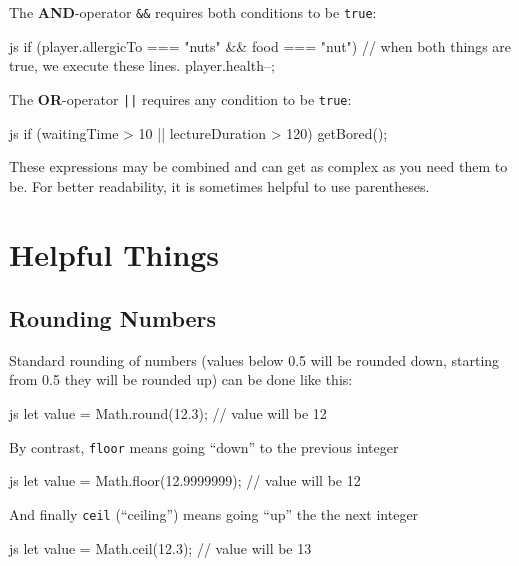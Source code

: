 \documentclass[10pt,a4paper]{article}
\begin{document}
\begin{multicols}{3}
The \textbf{AND}-operator \texttt{\&\&} requires both conditions to be \texttt{true}:
\begin{codebox}{js}{}
  if (player.allergicTo === "nuts" && food === "nut") {
    // when both things are true, we execute these lines.
    player.health--;
  }
\end{codebox}

The \textbf{OR}-operator \texttt{||} requires any condition to be \texttt{true}:
\begin{codebox}{js}{}
  if (waitingTime > 10 || lectureDuration > 120) {
    getBored();
  }
\end{codebox}
These expressions may be combined and can get as complex as you need them to be. For better readability, it is sometimes helpful to use parentheses.

\section*{Helpful Things}
\subsection*{Rounding Numbers}
Standard rounding of numbers (values below 0.5 will be rounded down, starting from 0.5 they will be rounded up) can be done like this:

\begin{codebox}{js}{}
  let value = Math.round(12.3); // value will be 12
\end{codebox}
By contrast, \texttt{floor} means going \enquote{down} to the previous integer
\begin{codebox}{js}{}
  let value = Math.floor(12.9999999); // value will be 12
\end{codebox}
And finally \texttt{ceil} (\enquote{ceiling}) means going \enquote{up} the the next integer
\begin{codebox}{js}{}
  let value = Math.ceil(12.3); // value will be 13
\end{codebox}




\printbibliography
{}
\end{multicols}
\end{document}
